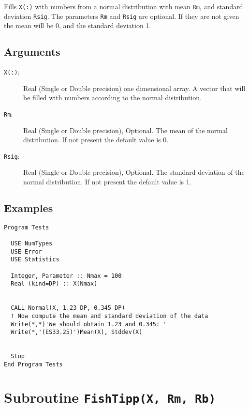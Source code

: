Fills \texttt{X(:)} with numbers from a normal distribution with mean
\texttt{Rm}, and standard deviation \texttt{Rsig}. The parameters
\texttt{Rm} and \texttt{Rsig} are optional. If they are not given the
mean will be 0, and the standard deviation 1.

\subsection{Arguments}

\begin{description}
\item[\texttt{X(:)}:] Real (Single or Double precision) one
  dimensional array. A vector that will be filled with numbers
  according to the normal distribution.
\item[\texttt{Rm}:] Real (Single or Double precision), Optional. The
  mean of the normal distribution. If not present the default value
  is 0.
\item[\texttt{Rsig}:] Real (Single or Double precision), Optional. The
  standard deviation of the normal distribution.  If not present the
  default value is 1. 
\end{description}

\subsection{Examples}

\begin{lstlisting}[emph=Normal,
                   emphstyle=\color{blue},
                   frame=trBL,
                   caption=Obtaining numbers with a normal distribution.,
                   label=normal]
Program Tests

  USE NumTypes
  USE Error
  USE Statistics

  Integer, Parameter :: Nmax = 100
  Real (kind=DP) :: X(Nmax)


  CALL Normal(X, 1.23_DP, 0.345_DP)
  ! Now compute the mean and standard deviation of the data
  Write(*,*)'We should obtain 1.23 and 0.345: '
  Write(*,'(ES33.25)')Mean(X), Stddev(X)


  Stop
End Program Tests
\end{lstlisting}


\section{Subroutine \texttt{FishTipp(X, Rm, Rb)}}

